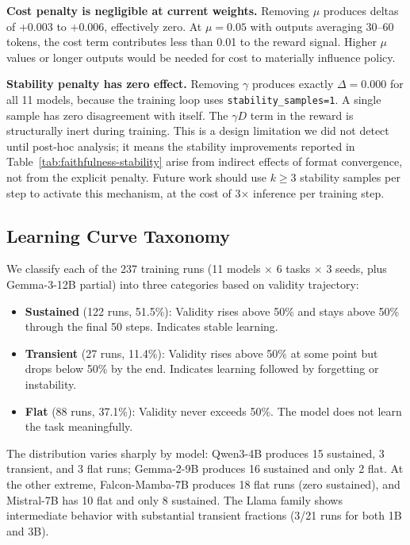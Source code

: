 \documentclass[11pt]{article}
\begin{document}
\textbf{Cost penalty is negligible at current weights.} Removing $\mu$ produces deltas of $+0.003$ to $+0.006$, effectively zero.  At $\mu = 0.05$ with outputs averaging 30--60 tokens, the cost term contributes less than 0.01 to the reward signal.  Higher $\mu$ values or longer outputs would be needed for cost to materially influence policy.

\textbf{Stability penalty has zero effect.} Removing $\gamma$ produces exactly $\Delta = 0.000$ for all 11 models, because the training loop uses \texttt{stability\_samples=1}.  A single sample has zero disagreement with itself.  The $\gamma D$ term in the reward is structurally inert during training.  This is a design limitation we did not detect until post-hoc analysis; it means the stability improvements reported in Table~\ref{tab:faithfulness-stability} arise from indirect effects of format convergence, not from the explicit penalty.  Future work should use $k \geq 3$ stability samples per step to activate this mechanism, at the cost of 3$\times$ inference per training step.

\subsection{Learning Curve Taxonomy}
\label{sec:curve-taxonomy}

We classify each of the 237 training runs (11 models $\times$ 6 tasks $\times$ 3 seeds, plus Gemma-3-12B partial) into three categories based on validity trajectory:
\begin{itemize}[leftmargin=12pt]
    \item \textbf{Sustained} (122 runs, 51.5\%): Validity rises above 50\% and stays above 50\% through the final 50 steps.  Indicates stable learning.
    \item \textbf{Transient} (27 runs, 11.4\%): Validity rises above 50\% at some point but drops below 50\% by the end.  Indicates learning followed by forgetting or instability.
    \item \textbf{Flat} (88 runs, 37.1\%): Validity never exceeds 50\%.  The model does not learn the task meaningfully.
\end{itemize}

The distribution varies sharply by model: Qwen3-4B produces 15 sustained, 3 transient, and 3 flat runs; Gemma-2-9B produces 16 sustained and only 2 flat.  At the other extreme, Falcon-Mamba-7B produces 18 flat runs (zero sustained), and Mistral-7B has 10 flat and only 8 sustained.  The Llama family shows intermediate behavior with substantial transient fractions (3/21 runs for both 1B and 3B).
\end{document}

